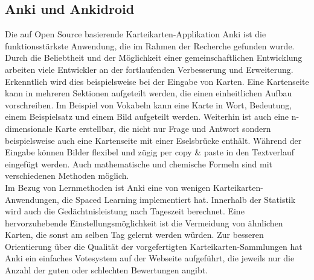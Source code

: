 \subsection{Anki und Ankidroid}
Die auf Open Source basierende Karteikarten-Applikation Anki \cite{ankiwebseite} \cite{ankidev} ist die funktionsstärkste Anwendung, die im Rahmen der Recherche gefunden wurde. Durch die Beliebtheit und der Möglichkeit einer gemeinschaftlichen Entwicklung arbeiten viele Entwickler an der fortlaufenden Verbesserung und Erweiterung. Erkenntlich wird dies beispielsweise bei der Eingabe von Karten. 
Eine Kartenseite kann in mehreren Sektionen aufgeteilt werden, die einen einheitlichen Aufbau vorschreiben. Im Beispiel von Vokabeln kann eine Karte in Wort, Bedeutung, einem Beispielsatz und einem Bild aufgeteilt werden. Weiterhin ist auch eine n-dimensionale Karte erstellbar, die nicht nur Frage und Antwort sondern beispielsweise auch eine Kartenseite mit einer Eselsbrücke enthält.  
Während der Eingabe können Bilder flexibel und zügig per copy {\&} paste in den Textverlauf eingefügt werden. Auch mathematische und chemische Formeln sind mit verschiedenen Methoden möglich. \\

Im Bezug von Lernmethoden ist Anki eine von wenigen Karteikarten-Anwendungen, die Spaced Learning implementiert hat. Innerhalb der Statistik wird auch die Gedächtnisleistung nach Tageszeit berechnet. Eine hervorzuhebende Einstellungsmöglichkeit ist die Vermeidung von ähnlichen Karten, die sonst am selben Tag gelernt werden würden. Zur besseren Orientierung über die Qualität der vorgefertigten Karteikarten-Sammlungen hat Anki ein einfaches Votesystem auf der Webseite aufgeführt, die jeweils nur die Anzahl der guten oder schlechten Bewertungen angibt. \\

